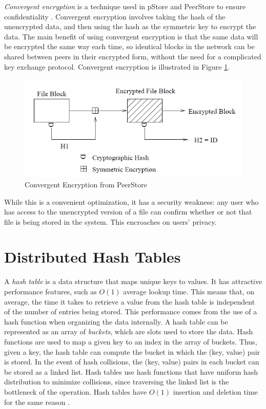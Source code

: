 \documentclass[12pt]{report}
\begin{document}
\textit{Convergent encryption} is a technique used in pStore and PeerStore to ensure confidentiality \cite{pStore, PeerStore}. Convergent encryption involves taking the hash of the unencrypted data, and then using the hash as the symmetric key to encrypt the data. The main benefit of using convergent encryption is that the same data will be encrypted the same way each time, so identical blocks in the network can be shared between peers in their encrypted form, without the need for a complicated key exchange protocol. Convergent encryption is illustrated in Figure \ref{fig:convergent}.

\begin{figure}
  \centering
  \includegraphics[scale=0.75]{figures/ConvergentEncryption}
  \caption{Convergent Encryption from PeerStore \label{fig:convergent}}
\end{figure}

While this is a convenient optimization, it has a security weakness: any user who has access to the unencrypted version of a file can confirm whether or not that file is being stored in the system. This encroaches on users' privacy.



\section{Distributed Hash Tables} \label{sec:backgroundDHT}

A \textit{hash table} is a data structure that maps unique keys to values. It has attractive performance features, such as $O(1)$ average lookup time. This means that, on average, the time it takes to retrieve a value from the hash table is independent of the number of entries being stored. This performance comes from the use of a hash function when organizing the data internally. A hash table can be represented as an array of \textit{buckets}, which are slots used to store the data. Hash functions are used to map a given key to an index in the array of buckets. Thus, given a key, the hash table can compute the bucket in which the (key, value) pair is stored. In the event of hash collisions, the (key, value) pairs in each bucket can be stored as a linked list. Hash tables use hash functions that have uniform hash distribution to minimize collisions, since traversing the linked list is the bottleneck of the operation. Hash tables have $O(1)$ insertion and deletion time for the same reason \cite{HashTable}.
\end{document}
